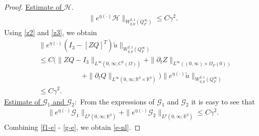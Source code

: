 \documentclass[12pt,a4paper,reqno]{amsart}
\theoremstyle{definition}
\theoremstyle{remark}
\numberwithin{equation}{section}
\newcommand{\ofo}{\Omega_{F}(0)}
\newcommand{\rt}{\mathbb{R}^{3}}
\begin{document}
\begin{proof}
\underline{Estimate of $\mathcal{H}.$}
\begin{align} \label{h-e}
\|e^{\eta (\cdot)}\mathcal{H}\|_{W^{2,1}_{q,p}(Q_{F}^{\infty})} \leqslant C\gamma^{2}.
\end{align}
Using \eqref{z2} and \eqref{z3}, we obtain
\begin{align*}
&\|e^{\eta (\cdot)}(I_{3} - [ZQ]^{T}) \widetilde u\|_{W^{2,1}_{q,p}(Q_{F}^{\infty})} \\
& \leqslant C \Big( \|ZQ - I_{3}\|_{L^{\infty}(0,\infty;C^{2}(\Omega))} + \|\partial_{t} Z\|_{L^{\infty}((0,\infty)\times \ofo)} \\
& \qquad \qquad \qquad + \|\partial_{t} Q\|_{L^{\infty}(0,\infty;\rt \times \rt)} \Big) \|e^{\eta(\cdot)} \widetilde u\|_{W^{2,1}_{q,p}(Q^{\infty}_{F})} \\
& \leqslant C \gamma^{2}.
\end{align*}
\underline{Estimate of $\mathcal{G}_{1}$ and $\mathcal{G}_{2}:$} From the expressions of $\mathcal{G}_{1}$ and $\mathcal{G}_{2}$ it is easy to see that
\begin{align} \label{g-e}
\|e^{\eta (\cdot)}\mathcal {G}_{1}\|_{L^{p}(0,\infty;\rt)} + \|e^{\eta (\cdot)}\mathcal {G}_{2}\|_{L^{p}(0,\infty;\rt)} \leqslant  C \gamma^{2}.
\end{align}
Combining \eqref{f1-e} - \eqref{g-e}, we obtain \eqref{e-nl}.
\end{proof}
\end{document}

